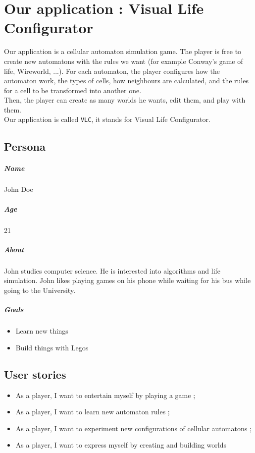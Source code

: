 \documentclass{report}
\begin{document}
\chapter{Our application : Visual Life Configurator}
Our application is a cellular automaton simulation game. The player is free to create new automatons with the rules we want (for example Conway's game of life, Wireworld, ...).
For each automaton, the player configures how the automaton work, the types of cells, how neighbours are calculated, and the rules for a cell to be transformed into another one.\\
Then, the player can create as many worlds he wants, edit them, and play with them.\\
Our application is called \texttt{VLC}, it stands for Visual Life Configurator.

\section{Persona}

\paragraph{Name}
John Doe
\paragraph{Age}
21
\paragraph{About}
John studies computer science. He is interested into algorithms and life simulation. John likes playing games on his phone while waiting for his bus while going to the University.
\paragraph{Goals}
\begin{itemize}
\item Learn new things
\item Build things with Legos
\end{itemize}

\section{User stories}
\begin{itemize}
	\item As a player, I want to entertain myself by playing a game ;
	\item As a player, I want to learn new automaton rules ;
	\item As a player, I want to experiment new configurations of cellular automatons ;
	\item As a player, I want to express myself by creating and building worlds
\end{itemize}
\end{document}

